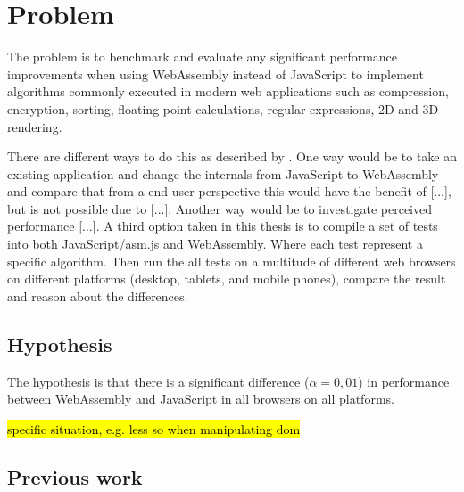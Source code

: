 \section{Problem}
\label{problem}

The problem is to benchmark and evaluate any significant performance improvements \parencite{HaasRossbergSchuffTitzerHolmanGohmanWagnerZakaiBastien2017,ReiserBlaser2017,Zakai2018} when using WebAssembly instead of JavaScript to implement algorithms commonly executed in modern web applications such as compression, encryption, sorting, floating point calculations, regular expressions, 2D and 3D rendering.

There are different ways to do this as described by \textcite{WohlinRunesonHostOhlssonRegnellWesslen2012}. One way would be to take an existing application and change the internals from JavaScript to WebAssembly and compare that from a end user perspective this would have the benefit of [...], but is not possible due to [...]. Another way would be to investigate perceived performance [...]. A third option taken in this thesis is to compile a set of tests into both JavaScript/asm.js and WebAssembly. Where each test represent a specific algorithm. Then run the all tests on a multitude of different web browsers on different platforms (desktop, tablets, and mobile phones), compare the result and reason about the differences.




\subsection{Hypothesis}

The hypothesis is that there is a significant difference ($\alpha = 0,01$) in performance between WebAssembly and JavaScript in all browsers on all platforms.

\hl{specific situation, e.g. less so when manipulating dom}

\subsection{Previous work}

